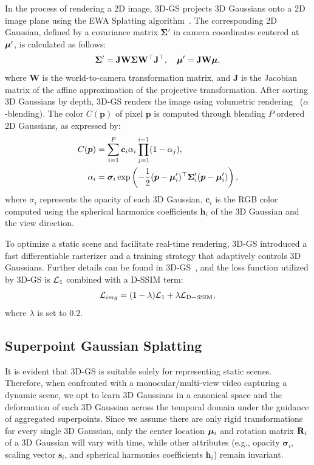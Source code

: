 In the process of rendering a 2D image, 3D-GS projects 3D Gaussians onto a 2D image plane using the EWA Splatting algorithm~\cite{Zwicker2001SurfaceS}. The corresponding 2D Gaussian, defined by a covariance matrix $\mathbf{\Sigma}'$ in camera coordinates centered at $\bm{\mu}'$, is calculated as follows:
\begin{equation}
    \mathbf{\Sigma}' = \mathbf{J}\mathbf{W}\mathbf{\Sigma}\mathbf{W}^{\top}\mathbf{J}^{\top}, \quad \bm{\mu}' = \mathbf{J}\mathbf{W}\bm{\mu},
\end{equation}
where $\mathbf{W}$ is the world-to-camera transformation matrix, and $\mathbf{J}$ is the Jacobian matrix of the affine approximation of the projective transformation. After sorting 3D Gaussians by depth, 3D-GS renders the image using volumetric rendering~\cite{VolumeRendering} (\ie $\alpha$-blending). The color $C(\bm{p})$ of pixel $\bm{p}$ is computed through blending $P$ ordered 2D Gaussians, as expressed by:
\begin{equation}
    \begin{split}
    C(\bm{p}) & = \sum_{i=1}^{P}\bm{c}_i\alpha_i \prod_{j=1}^{i-1}(1-\alpha_j), \\
    \alpha_i & = \bm{\sigma}_i \exp\left(-\frac{1}{2}(\bm{p}-\bm{\mu}'_i)^{\top}\mathbf{\Sigma}'_i(\bm{p}-\bm{\mu}'_i)\right),
    \end{split}
\end{equation}
where $\sigma_i$ represents the opacity of each 3D Gaussian, $\bm{c}_i$ is the RGB color computed using the spherical harmonics coefficients $\bm{h}_i$ of the 3D Gaussian and the view direction.

To optimize a static scene and facilitate real-time rendering, 3D-GS introduced a fast differentiable rasterizer and a training strategy that adaptively controls 3D Gaussians. Further details can be found in 3D-GS~\cite{3D-GS}, and the loss function utilized by 3D-GS is $\mathcal{L}_1$ combined with a D-SSIM term:
\begin{equation}
    \mathcal{L}_{img} = (1-\lambda)\mathcal{L}_{1} + \lambda \mathcal{L}_{\mathrm{D-SSIM}},
\end{equation}
where $\lambda$ is set to $0.2$.


\subsection{Superpoint Gaussian Splatting} \label{sec:SP}

It is evident that 3D-GS is suitable solely for representing static scenes. 
Therefore, when confronted with a monocular/multi-view video capturing a dynamic scene, we opt to learn 3D Gaussians in a canonical space and the deformation of each 3D Gaussian across the temporal domain under the guidance of aggregated superpoints. Since we assume there are only rigid transformations for every single 3D Gaussian, only the center location $\bm{\mu}_i$ and rotation matrix $\mathbf{R}_i$ of a 3D Gaussian will vary with time, while other attributes (e.g., opacity $\bm{\sigma}_i$, scaling vector $\bm{s}_i$, and spherical harmonics coefficients $\bm{h}_i$) remain invariant.

